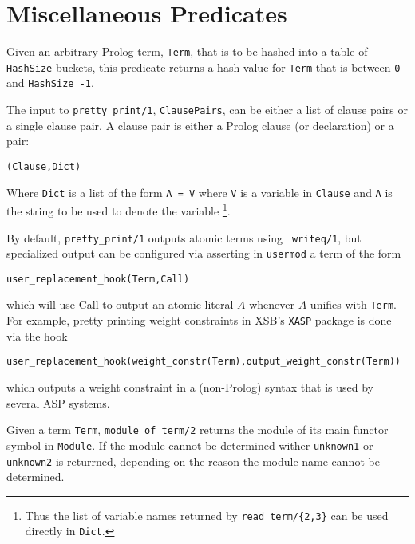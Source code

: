 \section{Miscellaneous Predicates}

\begin{description}

%
Given an arbitrary Prolog term, {\tt Term}, that is to be hashed into
a table of {\tt HashSize} buckets, this predicate returns a hash value
for {\tt Term} that is between {\tt 0} and {\tt HashSize -1}.

%
The input to {\tt pretty\_print/1}, {\tt ClausePairs}, can be either a
list of clause pairs or a single clause pair.  A clause pair is either
a Prolog clause (or declaration) or a pair:
%
\begin{center}
{\tt (Clause,Dict)} 
\end{center}
%
Where {\tt Dict} is a list of the form {\tt A = V} where {\tt V} is a
variable in {\tt Clause} and {\tt A} is the string to be used to
denote the variable \footnote{Thus the list of variable names returned
by {\tt read\_term/\{2,3\}} can be used directly in {\tt Dict}.}.

By default, {\tt pretty\_print/1} outputs atomic terms using {\tt
writeq/1}, but specialized output can be configured via asserting in
{\tt usermod} a term of the form
%
\begin{center}
{\tt user\_replacement\_hook(Term,Call)}
\end{center}
%
which will use Call to output an atomic literal $A$ whenever $A$
unifies with {\tt Term}.  For example, pretty printing weight
constraints in XSB's {\tt XASP} package is done via the hook
%
\begin{center}
{\tt user\_replacement\_hook(weight\_constr(Term),output\_weight\_constr(Term))}
\end{center}
%
which outputs a weight constraint in a (non-Prolog) syntax that is 
used by several ASP systems.

%
Given a term {\tt Term}, {\tt module\_of\_term/2} returns the module
of its main functor symbol in {\tt Module}.  If the module cannot be
determined wither {\tt unknown1} or {\tt unknown2} is returrned,
depending on the reason the module name cannot be determined.

\end{description}

